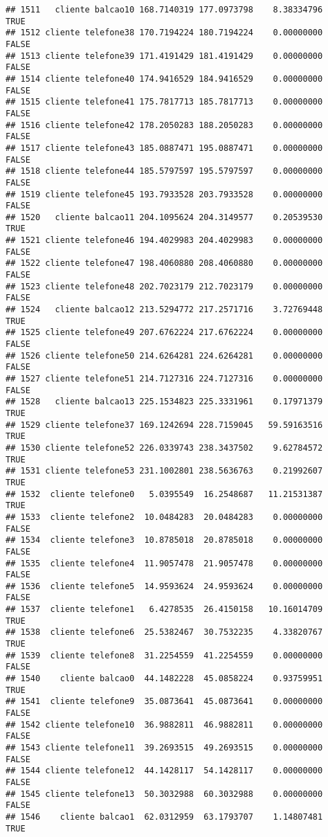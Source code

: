 \documentclass[
]{article}
\begin{document}
\begin{verbatim}
## 1511   cliente balcao10 168.7140319 177.0973798    8.38334796     TRUE
## 1512 cliente telefone38 170.7194224 180.7194224    0.00000000    FALSE
## 1513 cliente telefone39 171.4191429 181.4191429    0.00000000    FALSE
## 1514 cliente telefone40 174.9416529 184.9416529    0.00000000    FALSE
## 1515 cliente telefone41 175.7817713 185.7817713    0.00000000    FALSE
## 1516 cliente telefone42 178.2050283 188.2050283    0.00000000    FALSE
## 1517 cliente telefone43 185.0887471 195.0887471    0.00000000    FALSE
## 1518 cliente telefone44 185.5797597 195.5797597    0.00000000    FALSE
## 1519 cliente telefone45 193.7933528 203.7933528    0.00000000    FALSE
## 1520   cliente balcao11 204.1095624 204.3149577    0.20539530     TRUE
## 1521 cliente telefone46 194.4029983 204.4029983    0.00000000    FALSE
## 1522 cliente telefone47 198.4060880 208.4060880    0.00000000    FALSE
## 1523 cliente telefone48 202.7023179 212.7023179    0.00000000    FALSE
## 1524   cliente balcao12 213.5294772 217.2571716    3.72769448     TRUE
## 1525 cliente telefone49 207.6762224 217.6762224    0.00000000    FALSE
## 1526 cliente telefone50 214.6264281 224.6264281    0.00000000    FALSE
## 1527 cliente telefone51 214.7127316 224.7127316    0.00000000    FALSE
## 1528   cliente balcao13 225.1534823 225.3331961    0.17971379     TRUE
## 1529 cliente telefone37 169.1242694 228.7159045   59.59163516     TRUE
## 1530 cliente telefone52 226.0339743 238.3437502    9.62784572     TRUE
## 1531 cliente telefone53 231.1002801 238.5636763    0.21992607     TRUE
## 1532  cliente telefone0   5.0395549  16.2548687   11.21531387     TRUE
## 1533  cliente telefone2  10.0484283  20.0484283    0.00000000    FALSE
## 1534  cliente telefone3  10.8785018  20.8785018    0.00000000    FALSE
## 1535  cliente telefone4  11.9057478  21.9057478    0.00000000    FALSE
## 1536  cliente telefone5  14.9593624  24.9593624    0.00000000    FALSE
## 1537  cliente telefone1   6.4278535  26.4150158   10.16014709     TRUE
## 1538  cliente telefone6  25.5382467  30.7532235    4.33820767     TRUE
## 1539  cliente telefone8  31.2254559  41.2254559    0.00000000    FALSE
## 1540    cliente balcao0  44.1482228  45.0858224    0.93759951     TRUE
## 1541  cliente telefone9  35.0873641  45.0873641    0.00000000    FALSE
## 1542 cliente telefone10  36.9882811  46.9882811    0.00000000    FALSE
## 1543 cliente telefone11  39.2693515  49.2693515    0.00000000    FALSE
## 1544 cliente telefone12  44.1428117  54.1428117    0.00000000    FALSE
## 1545 cliente telefone13  50.3032988  60.3032988    0.00000000    FALSE
## 1546    cliente balcao1  62.0312959  63.1793707    1.14807481     TRUE

\end{verbatim}
\end{document}

